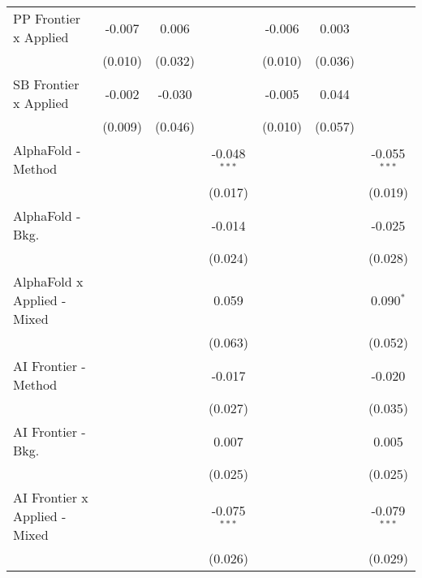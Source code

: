 \begin{tabular}{lcccccc}
   PP Frontier x Applied          & -0.007         & 0.006        &                & -0.006         & 0.003        &   \\   
                                  & (0.010)        & (0.032)      &                & (0.010)        & (0.036)      &   \\   
   SB Frontier x Applied          & -0.002         & -0.030       &                & -0.005         & 0.044        &   \\   
                                  & (0.009)        & (0.046)      &                & (0.010)        & (0.057)      &   \\   
   AlphaFold - Method             &                &              & -0.048$^{***}$ &                &              & -0.055$^{***}$\\   
                                  &                &              & (0.017)        &                &              & (0.019)\\   
   AlphaFold - Bkg.               &                &              & -0.014         &                &              & -0.025\\   
                                  &                &              & (0.024)        &                &              & (0.028)\\   
   AlphaFold x Applied - Mixed    &                &              & 0.059          &                &              & 0.090$^{*}$\\   
                                  &                &              & (0.063)        &                &              & (0.052)\\   
   AI Frontier - Method           &                &              & -0.017         &                &              & -0.020\\   
                                  &                &              & (0.027)        &                &              & (0.035)\\   
   AI Frontier - Bkg.             &                &              & 0.007          &                &              & 0.005\\   
                                  &                &              & (0.025)        &                &              & (0.025)\\   
   AI Frontier x Applied - Mixed  &                &              & -0.075$^{***}$ &                &              & -0.079$^{***}$\\   
                                  &                &              & (0.026)        &                &              & (0.029)\\   

\end{tabular}
